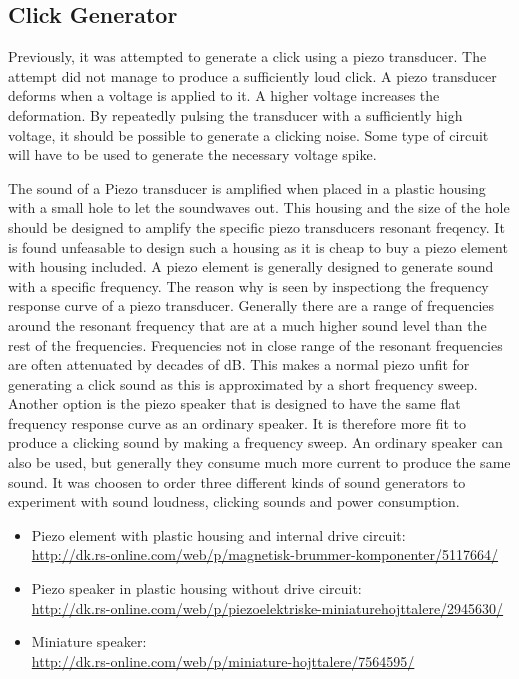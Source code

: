 \subsection{Click Generator} %
\label{sub:click_generator}
Previously, it was attempted to generate a click using a piezo transducer.
The attempt did not manage to produce a sufficiently loud click.
A piezo transducer deforms when a voltage is applied to it.
A higher voltage increases the deformation.
By repeatedly pulsing the transducer with a sufficiently high voltage, it should be possible to generate a clicking noise.
Some type of circuit will have to be used to generate the necessary voltage spike.

The sound of a Piezo transducer is amplified when placed in a plastic housing with a small hole to let the soundwaves out.
This housing and the size of the hole should be designed to amplify the specific piezo transducers resonant freqency.
It is found unfeasable to design such a housing as it is cheap to buy a piezo element with housing included.
A piezo element is generally designed to generate sound with a specific frequency.
The reason why is seen by inspectiong the frequency response curve of a piezo transducer.
Generally there are a range of frequencies around the resonant frequency that are at a much higher sound level than the rest of the frequencies.
Frequencies not in close range of the resonant frequencies are often attenuated by decades of dB.
This makes a normal piezo unfit for generating a click sound as this is approximated by a short frequency sweep.
Another option is the piezo speaker that is designed to have the same flat frequency response curve as an ordinary speaker.
It is therefore more fit to produce a clicking sound by making a frequency sweep.
An ordinary speaker can also be used, but generally they consume much more current to produce the same sound.
It was choosen to order three different kinds of sound generators to experiment with sound loudness, clicking sounds and power consumption.
\begin{itemize}
  \item Piezo element with plastic housing and internal drive circuit:\\
        \url{http://dk.rs-online.com/web/p/magnetisk-brummer-komponenter/5117664/}
  \item Piezo speaker in plastic housing without drive circuit: \\
        \url{http://dk.rs-online.com/web/p/piezoelektriske-miniaturehojttalere/2945630/}
  \item Miniature speaker:\\
          \url{http://dk.rs-online.com/web/p/miniature-hojttalere/7564595/}
\end{itemize}
